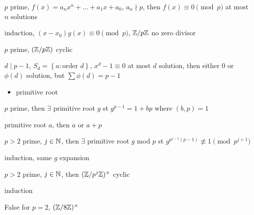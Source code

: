 \begin{thm}
    $p$ prime, $f(x) = a_n x^n + \dots + a_{1}x + a_0$, $a_n \nmid p$, then $f(x) \equiv 0 \pmod p$ at most $n$ solutions
\end{thm}
\begin{pf}
    induction, $(x - x_0)g(x) \equiv 0 \pmod{p}$, $\mathbb{Z}/p\mathbb{Z}$ no zero divisor
\end{pf}

\begin{thm}
    $p$ prime, $(\mathbb{Z}/p\mathbb{Z})$ cyclic
\end{thm}
\begin{pf}
    $d \mid p - 1$, $S_d = \left\{ a : \text{order } d \right\}$, $x^d - 1 \equiv 0$ at most $d$ solution, then either 0 or $\phi(d)$ solution, but $\sum \phi(d) = p-1$
\end{pf}

\begin{itemize}
    \item primitive root
\end{itemize}

\begin{lemma}
    $p$ prime, then $\exists$ primitive root $g$ st $g^{p-1} = 1 + bp$ where $(b, p) = 1$
\end{lemma}
\begin{pf}
    primitive root $a$, then $a$ or $a+p$
\end{pf}

\begin{lemma}
    $p > 2$ prime, $j \in \mathbb{N}$, then $\exists$ primitive root $g$ mod $p$ st $g^{p^{j-1}(p-1)} \not\equiv 1 \pmod{p^{j+1}}$
\end{lemma}
\begin{pf}
    induction, same $g$ expansion
\end{pf}

\begin{thm}
    $p > 2$ prime, $j \in \mathbb{N}$, then $(\mathbb{Z}/p^j\mathbb{Z})^\times$ cyclic
\end{thm}
\begin{pf}
    induction
\end{pf}

\begin{pf}
    False for $p = 2$, $(\mathbb{Z}/8\mathbb{Z})^\times$
\end{pf}


